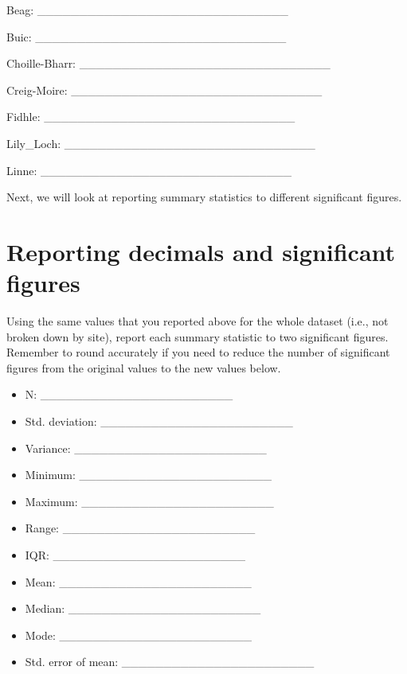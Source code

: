 \documentclass[
  openany]{scrbook}
\providecommand{\tightlist}{%
  \setlength{\itemsep}{0pt}\setlength{\parskip}{0pt}}
\begin{document}
Beag: \_\_\_\_\_\_\_\_\_\_\_\_\_\_\_\_\_\_\_\_\_\_\_\_\_\_\_\_\_\_

Buic: \_\_\_\_\_\_\_\_\_\_\_\_\_\_\_\_\_\_\_\_\_\_\_\_\_\_\_\_\_\_

Choille-Bharr: \_\_\_\_\_\_\_\_\_\_\_\_\_\_\_\_\_\_\_\_\_\_\_\_\_\_\_\_\_\_

Creig-Moire: \_\_\_\_\_\_\_\_\_\_\_\_\_\_\_\_\_\_\_\_\_\_\_\_\_\_\_\_\_\_

Fidhle: \_\_\_\_\_\_\_\_\_\_\_\_\_\_\_\_\_\_\_\_\_\_\_\_\_\_\_\_\_\_

Lily\_Loch: \_\_\_\_\_\_\_\_\_\_\_\_\_\_\_\_\_\_\_\_\_\_\_\_\_\_\_\_\_\_

Linne: \_\_\_\_\_\_\_\_\_\_\_\_\_\_\_\_\_\_\_\_\_\_\_\_\_\_\_\_\_\_

Next, we will look at reporting summary statistics to different significant figures.

\hypertarget{reporting-decimals-and-significant-figures}{%
\section{Reporting decimals and significant figures}\label{reporting-decimals-and-significant-figures}}

Using the same values that you reported above for the whole dataset (i.e., not broken down by site), report each summary statistic to two significant figures.
Remember to round accurately if you need to reduce the number of significant figures from the original values to the new values below.

\begin{itemize}
\tightlist
\item
  N: \_\_\_\_\_\_\_\_\_\_\_\_\_\_\_\_\_\_\_\_\_\_\_
\item
  Std. deviation: \_\_\_\_\_\_\_\_\_\_\_\_\_\_\_\_\_\_\_\_\_\_\_
\item
  Variance: \_\_\_\_\_\_\_\_\_\_\_\_\_\_\_\_\_\_\_\_\_\_\_
\item
  Minimum: \_\_\_\_\_\_\_\_\_\_\_\_\_\_\_\_\_\_\_\_\_\_\_
\item
  Maximum: \_\_\_\_\_\_\_\_\_\_\_\_\_\_\_\_\_\_\_\_\_\_\_
\item
  Range: \_\_\_\_\_\_\_\_\_\_\_\_\_\_\_\_\_\_\_\_\_\_\_
\item
  IQR: \_\_\_\_\_\_\_\_\_\_\_\_\_\_\_\_\_\_\_\_\_\_\_
\item
  Mean: \_\_\_\_\_\_\_\_\_\_\_\_\_\_\_\_\_\_\_\_\_\_\_
\item
  Median: \_\_\_\_\_\_\_\_\_\_\_\_\_\_\_\_\_\_\_\_\_\_\_
\item
  Mode: \_\_\_\_\_\_\_\_\_\_\_\_\_\_\_\_\_\_\_\_\_\_\_
\item
  Std. error of mean: \_\_\_\_\_\_\_\_\_\_\_\_\_\_\_\_\_\_\_\_\_\_\_
\end{itemize}
\end{document}
